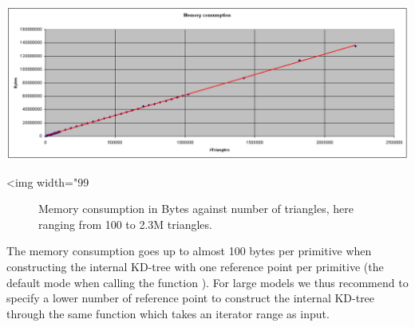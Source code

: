 \begin{center}
    \label{fig:AABB-tree-memory}
    \begin{ccTexOnly}
      \includegraphics[width=1.0\textwidth]{AABB_tree/figs/memory}
    \end{ccTexOnly}
    \begin{ccHtmlOnly}
        <img width="99%
    \end{ccHtmlOnly}
    \begin{figure}[h]
        \caption{Memory consumption in Bytes against number of triangles, here
                 ranging from 100 to 2.3M triangles.}
    \end{figure}
\end{center}

The memory consumption goes up to almost 100 bytes per primitive when constructing the internal KD-tree with one reference point per primitive (the default mode when calling the function ). For large models we thus recommend to specify a lower number of reference point to construct the internal KD-tree through the same function which takes an iterator range as input.